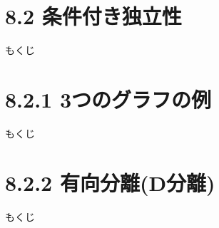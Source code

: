 \documentclass[dvipdfm, t]{beamer}
\begin{document}
 \section{8.2 条件付き独立性}
 \begin{frame}{もくじ}
  \tableofcontents[currentsection]
 \end{frame}
 

 \section{8.2.1 3つのグラフの例}
 \begin{frame}{もくじ}
  \tableofcontents[currentsection]
 \end{frame}
 

 \section{8.2.2 有向分離(D分離)}
 \begin{frame}{もくじ}
  \tableofcontents[currentsection]
 \end{frame}
 
\end{document}
